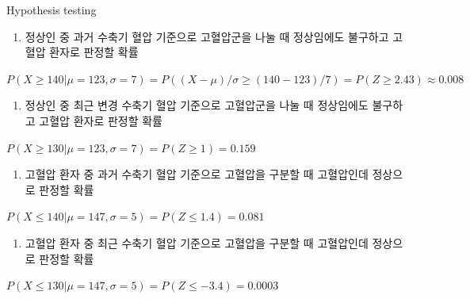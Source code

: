 \documentclass[9pt,ignorenonframetext,xcolor=dvipsnames]{beamer}
\providecommand{\tightlist}{%
  \setlength{\itemsep}{0pt}\setlength{\parskip}{0pt}}
\newlength{\wideitemsep}
\let\olditem\item
\renewcommand{\item}{\setlength{\itemsep}{\wideitemsep}\olditem}
\begin{document}
\begin{frame}{Hypothesis testing}

\begin{enumerate}
\def\labelenumi{\arabic{enumi}.}
\tightlist
\item
  정상인 중 과거 수축기 혈압 기준으로 고혈압군을 나눌 때 정상임에도
  불구하고 고혈압 환자로 판정할 확률
\end{enumerate}

\(P(X \geq 140 | \mu = 123, \sigma = 7) = P((X - \mu)/\sigma \geq (140-123)/7) = P(Z \geq 2.43) \approx 0.008\)

\begin{enumerate}
\def\labelenumi{\arabic{enumi}.}
\setcounter{enumi}{1}
\tightlist
\item
  정상인 중 최근 변경 수축기 혈압 기준으로 고혈압군을 나눌 때 정상임에도
  불구하고 고혈압 환자로 판정할 확률
\end{enumerate}

\(P(X \geq 130 | \mu = 123, \sigma = 7) = P(Z \geq 1) = 0.159\)

\begin{enumerate}
\def\labelenumi{\arabic{enumi}.}
\setcounter{enumi}{2}
\tightlist
\item
  고혈압 환자 중 과거 수축기 혈압 기준으로 고혈압을 구분할 때 고혈압인데
  정상으로 판정할 확률
\end{enumerate}

\(P(X \leq 140 | \mu = 147, \sigma = 5) = P(Z \leq 1.4) = 0.081\)

\begin{enumerate}
\def\labelenumi{\arabic{enumi}.}
\setcounter{enumi}{3}
\tightlist
\item
  고혈압 환자 중 최근 수축기 혈압 기준으로 고혈압을 구분할 때 고혈압인데
  정상으로 판정할 확률
\end{enumerate}

\(P(X \leq 130 | \mu = 147, \sigma = 5) = P(Z \leq -3.4) = 0.0003\)

\end{frame}
\end{document}
